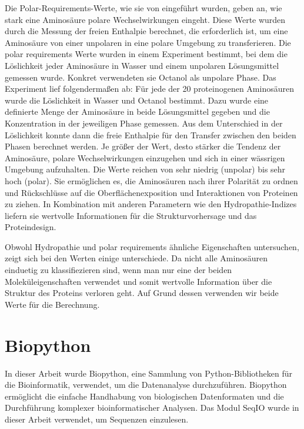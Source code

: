 \documentclass[german,version-2022-01]{uzl-thesis}
\begin{document}
Die Polar-Requirements-Werte, wie sie von \citeauthor{woese_fundamental_1966} eingef\"uhrt wurden, geben an, wie stark eine Aminos\"aure polare Wechselwirkungen eingeht. Diese Werte wurden durch die Messung der freien Enthalpie berechnet, die erforderlich ist, um eine Aminos\"aure von einer unpolaren in eine polare Umgebung zu transferieren. Die polar requirements Werte wurden in einem Experiment bestimmt, bei dem die L\"oslichkeit jeder Aminos\"aure in Wasser und einem unpolaren L\"osungsmittel gemessen wurde. Konkret verwendeten sie Octanol als unpolare Phase. Das Experiment lief folgenderma\ss{}en ab: F\"ur jede der 20 proteinogenen Aminos\"auren wurde die L\"oslichkeit in Wasser und Octanol bestimmt. Dazu wurde eine definierte Menge der Aminos\"aure in beide L\"osungsmittel gegeben und die Konzentration in der jeweiligen Phase gemessen. Aus dem Unterschied in der L\"oslichkeit konnte dann die freie Enthalpie f\"ur den Transfer zwischen den beiden Phasen berechnet werden. Je gr\"o\ss{}er der Wert, desto st\"arker die Tendenz der Aminos\"aure, polare Wechselwirkungen einzugehen und sich in einer w\"assrigen Umgebung aufzuhalten. Die Werte reichen von sehr niedrig (unpolar) bis sehr hoch (polar). Sie erm\"oglichen es, die Aminos\"auren nach ihrer Polarit\"at zu ordnen und R\"uckschl\"usse auf die Oberfl\"achenexposition und Interaktionen von Proteinen zu ziehen. In Kombination mit anderen Parametern wie den Hydropathie-Indizes liefern sie wertvolle Informationen f\"ur die Strukturvorhersage und das Proteindesign.

Obwohl Hydropathie und polar requirements \"ahnliche Eigenschaften untersuchen, zeigt sich bei den Werten einige unterschiede. Da nicht alle Aminos\"auren einduetig zu klassifiezieren sind, wenn man nur eine der beiden Molek\"uleigenschaften verwendet und somit wertvolle Information \"uber die Struktur des Proteins verloren geht. Auf Grund dessen verwenden wir beide Werte f\"ur die Berechnung. 

\section{Biopython}
In dieser Arbeit wurde Biopython, eine Sammlung von Python-Bibliotheken f\"ur die Bioinformatik, verwendet, um die Datenanalyse durchzuf\"uhren. Biopython erm\"oglicht die einfache Handhabung von biologischen Datenformaten und die Durchf\"uhrung komplexer bioinformatischer Analysen. Das Modul SeqIO wurde in dieser Arbeit verwendet, um Sequenzen einzulesen. 
\end{document}
